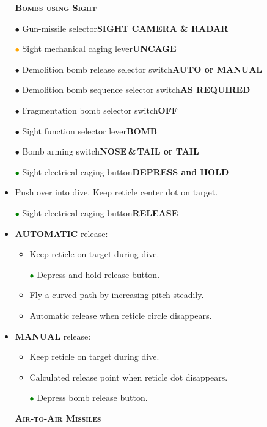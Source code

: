 \documentclass[a4paper,12pt,dvipsnames]{letter}
\newcommand{\button}[1]{\textbf{#1}}
\newcommand{\myHead}[1]{{\LARGE\textsc{\textbf{#1}}}}
\newcommand{\bi}{\textcolor{ProcessBlue}{$\bullet$\;}}
\newcommand{\gi}{\textcolor{Green}{$\bullet$\;}}
\newcommand{\oi}{\textcolor{Orange}{$\bullet$\;}}
\begin{document}
{%
\newpage
\begin{itemize}
 \item[] \myHead{Bombs using Sight}
 \item[\bi] Gun-missile selector\dotfill\button{SIGHT CAMERA \& RADAR}
 \item[\oi] Sight mechanical caging lever\dotfill\button{UNCAGE}
 \item[\bi] Demolition bomb release selector switch\dotfill\button{AUTO or MANUAL}
 \item[\bi] Demolition bomb sequence selector switch\dotfill\button{AS REQUIRED}
 \item[\bi] Fragmentation bomb selector switch\dotfill\button{OFF}
 \item[\bi] Sight function selector lever\dotfill\button{BOMB}
 \item[\bi] Bomb arming switch\dotfill\button{NOSE\,\&\,TAIL or TAIL}
 \item[\gi] Sight electrical caging button\dotfill\button{DEPRESS and HOLD}
 \item Push over into dive. Keep reticle center dot on target.
 \item[\gi] Sight electrical caging button\dotfill\button{RELEASE}
 \item \textbf{AUTOMATIC} release:
 \begin{itemize}
 \item Keep reticle on target during dive.
 \item[\gi] Depress and hold release button.
 \item Fly a curved path by increasing pitch steadily.
 \item Automatic release when reticle circle disappears.
 \end{itemize}
 \item \textbf{MANUAL} release:
 \begin{itemize}
 \item Keep reticle on target during dive.
 \item Calculated release point when reticle dot disappears.
 \item[\gi] Depress bomb release button.
 \end{itemize}
\end{itemize}
\begin{itemize}
 \item[] \myHead{Air-to-Air Missiles}

\end{itemize}}
\end{document}
